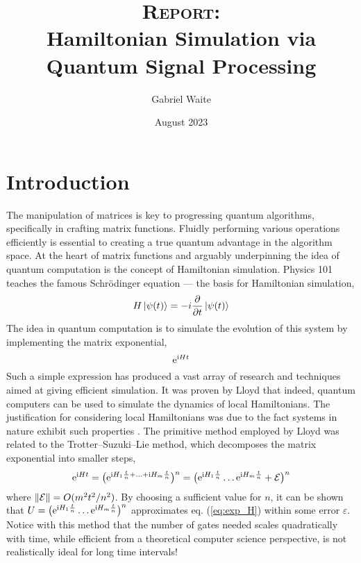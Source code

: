 \documentclass{article}
\title{\textsc{\textbf{Report:}}\\ Hamiltonian Simulation via \\ Quantum Signal Processing}
\author{Gabriel Waite}
\date{August 2023}
\begin{document}
\maketitle

\section{Introduction}
The manipulation of matrices is key to progressing quantum algorithms, specifically in crafting matrix functions. Fluidly performing various operations efficiently is essential to creating a true quantum advantage in the algorithm space. At the heart of matrix functions and arguably underpinning the idea of quantum computation \cite{Feynman82} is the concept of Hamiltonian simulation. Physics 101 teaches the famous Schrödinger equation --- the basis for Hamiltonian simulation,
\begin{equation}\label{eq:shcrodinger_eq}
    H\ket{\psi(t)} = -i\pdv{t}\ket{\psi(t)}
\end{equation}
The idea in quantum computation is to simulate the evolution of this system by implementing the matrix exponential,
\begin{equation}\label{eq:exp_H}
    \mathrm{e}^{\mathrm{i} Ht}
\end{equation}
Such a simple expression has produced a vast array of research and techniques aimed at giving efficient simulation. It was proven by Lloyd \cite{Lloyd1996} that indeed, quantum computers can be used to simulate the dynamics of local Hamiltonians. The justification for considering local Hamiltonians was due to the fact systems in nature exhibit such properties \cite{Ambainis14QMA,CN14}. The primitive method employed by Lloyd was related to the Trotter--Suzuki--Lie method, which decomposes the matrix exponential into smaller steps,
\begin{equation}
    \mathrm{e}^{\mathrm{i} Ht} = \big(\mathrm{e}^{\mathrm{i} H_1 \frac{t}{n} + \ldots + \mathrm{i} H_m \frac{t}{n}} \big)^n = \big(\mathrm{e}^{\mathrm{i} H_1 \frac{t}{n}}\ldots \mathrm{e}^{\mathrm{i} H_m \frac{t}{n}} + \mathcal{E} \big)^n
\end{equation}
where $\norm{\mathcal{E}} = O(m^2t^2/n^2)$. By choosing a sufficient value for $n$, it can be shown that $U = \big(\mathrm{e}^{\mathrm{i} H_1 \frac{t}{n}}\ldots \mathrm{e}^{\mathrm{i} H_m \frac{t}{n}}\big)^n$ approximates eq. (\ref{eq:exp_H}) within some error $\varepsilon$. Notice with this method that the number of gates needed scales quadratically with time, while efficient from a theoretical computer science perspective, is not realistically ideal for long time intervals!
\end{document}
